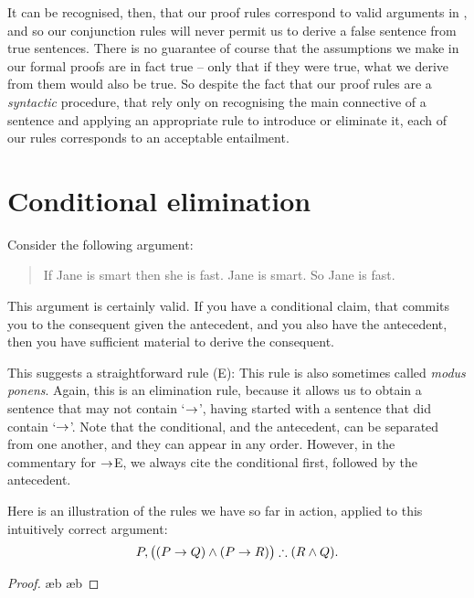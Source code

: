 It can be recognised, then, that our proof rules correspond to valid arguments in \TFL, and so our conjunction rules will never permit us to derive a false sentence from true sentences. There is no guarantee of course that the assumptions we make in our formal proofs are in fact true – only that if they were true, what we derive from them would also be true. So despite the fact that our proof rules are a \emph{syntactic} procedure, that rely only on recognising the main connective of a sentence and applying an appropriate rule to introduce or eliminate it, each of our rules corresponds to an acceptable entailment.


\section{Conditional elimination}\label{condelim}
Consider the following argument:
	\begin{quote}
		If Jane is smart then she is fast. Jane is smart. So Jane is fast.
	\end{quote}
This argument is certainly valid. If you have a conditional claim, that commits you to the consequent given the antecedent, and you also have the antecedent, then you have sufficient material to derive the consequent. 

This suggests a straightforward  rule ({\eif}E):
This rule is also sometimes called \emph{modus ponens}. Again, this is an elimination rule, because it allows us to obtain a sentence that may not contain `$\rightarrow$', having started with a sentence that did contain `$\rightarrow$'. Note that the conditional, and the antecedent, can be separated from one another, and they can appear in any order. However, in the commentary for $\rightarrow$E, we always cite the conditional first, followed by the antecedent.

Here is an illustration of the rules we have so far in action, applied to this intuitively correct argument: $$P, \bigl((P \rightarrow Q)\wedge(P \rightarrow R)\bigr) \mathrel{\therefore} (R \wedge Q).$$ \begin{proof}
	\open
	\ae{b}
	\ae{b}
\end{proof}\label{proof.within}

